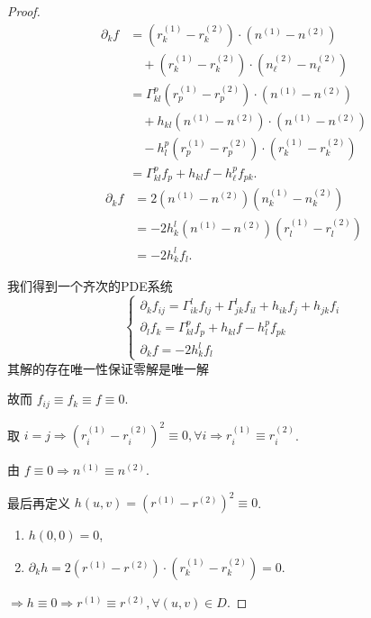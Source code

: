 \documentclass[lang=cn,10pt,thmcnt=section]{elegantbook}
\begin{document}
\begin{proof}
\begin{align*}
    \partial_k f &= (r_k^{(1)} - r_k^{(2)}) \cdot (n^{(1)} - n^{(2)}) \\
    &\quad + (r_k^{(1)} - r_k^{(2)}) \cdot (n_\ell^{(2)} - n_\ell^{(2)}) \\
    &= \Gamma_{kl}^p (r_p^{(1)} - r_p^{(2)}) \cdot (n^{(1)} - n^{(2)}) \\
    &\quad + h_{kl} (n^{(1)} - n^{(2)}) \cdot (n^{(1)} - n^{(2)}) \\
    &\quad - h_{l}^p (r_p^{(1)} - r_p^{(2)}) \cdot (r_k^{(1)} - r_k^{(2)}) \\
    &= \Gamma_{kl}^p f_p + h_{kl} f - h_{\ell}^p f_{pk}.
\end{align*}
\begin{align*}
    \partial_k f &= 2(n^{(1)} - n^{(2)}) (n_k^{(1)} - n_k^{(2)}) \\
    &= -2h_k^l (n^{(1)} - n^{(2)}) (r_l^{(1)} - r_l^{(2)}) \\
    &= -2h_k^l f_l.
\end{align*}

我们得到一个齐次的PDE系统
\[
\begin{cases}
    \partial_k f_{ij} = \Gamma_{ik}^l f_{lj} + \Gamma_{jk}^l f_{il} + h_{ik} f_j + h_{jk} f_i \\
    \partial_l f_k = \Gamma_{kl}^p f_p + h_{kl} f - h_l^p f_{pk} \\
    \partial_k f = -2h_k^l f_l
\end{cases}
\]
其解的存在唯一性保证零解是唯一解

故而 $f_{ij} \equiv f_k \equiv f \equiv 0$.

取 $i=j \Rightarrow (r_i^{(1)} - r_i^{(2)})^2 \equiv 0, \forall i \Rightarrow r_i^{(1)} \equiv r_i^{(2)}$.

由 $f \equiv 0 \Rightarrow n^{(1)} \equiv n^{(2)}$.

最后再定义 $h(u,v) = (r^{(1)} - r^{(2)})^2 \equiv 0$.

\begin{enumerate}
    \item $h(0,0) = 0$,
    \item $\partial_k h = 2(r^{(1)} - r^{(2)}) \cdot (r_k^{(1)} - r_k^{(2)}) = 0$.
\end{enumerate}

$\Rightarrow h \equiv 0 \Rightarrow r^{(1)} \equiv r^{(2)}, \forall (u,v) \in D$.
\end{proof}
\end{document}
